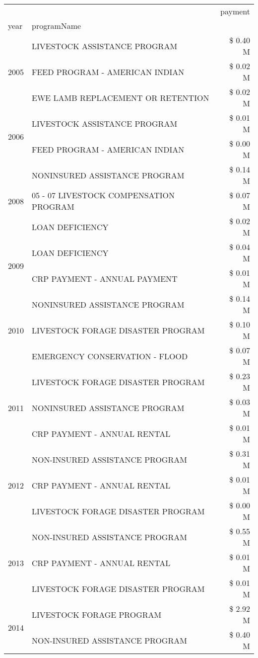 \begin{tabular}{llr}
\toprule
 &  & payment \\
year & programName &  \\
\midrule
\multirow[t]{3}{*}{2005} & LIVESTOCK ASSISTANCE PROGRAM & \$ 0.40 M \\
 & FEED PROGRAM - AMERICAN INDIAN & \$ 0.02 M \\
 & EWE LAMB REPLACEMENT OR RETENTION & \$ 0.02 M \\
\cline{1-3}
\multirow[t]{2}{*}{2006} & LIVESTOCK ASSISTANCE PROGRAM & \$ 0.01 M \\
 & FEED PROGRAM - AMERICAN INDIAN & \$ 0.00 M \\
\cline{1-3}
\multirow[t]{3}{*}{2008} & NONINSURED ASSISTANCE PROGRAM & \$ 0.14 M \\
 & 05 - 07 LIVESTOCK COMPENSATION PROGRAM & \$ 0.07 M \\
 & LOAN DEFICIENCY & \$ 0.02 M \\
\cline{1-3}
\multirow[t]{2}{*}{2009} & LOAN DEFICIENCY & \$ 0.04 M \\
 & CRP PAYMENT - ANNUAL PAYMENT & \$ 0.01 M \\
\cline{1-3}
\multirow[t]{3}{*}{2010} & NONINSURED ASSISTANCE PROGRAM & \$ 0.14 M \\
 & LIVESTOCK FORAGE DISASTER PROGRAM & \$ 0.10 M \\
 & EMERGENCY CONSERVATION - FLOOD & \$ 0.07 M \\
\cline{1-3}
\multirow[t]{3}{*}{2011} & LIVESTOCK FORAGE DISASTER PROGRAM & \$ 0.23 M \\
 & NONINSURED ASSISTANCE PROGRAM & \$ 0.03 M \\
 & CRP PAYMENT - ANNUAL RENTAL & \$ 0.01 M \\
\cline{1-3}
\multirow[t]{3}{*}{2012} & NON-INSURED ASSISTANCE PROGRAM & \$ 0.31 M \\
 & CRP PAYMENT - ANNUAL RENTAL & \$ 0.01 M \\
 & LIVESTOCK FORAGE DISASTER PROGRAM & \$ 0.00 M \\
\cline{1-3}
\multirow[t]{3}{*}{2013} & NON-INSURED ASSISTANCE PROGRAM & \$ 0.55 M \\
 & CRP PAYMENT - ANNUAL RENTAL & \$ 0.01 M \\
 & LIVESTOCK FORAGE DISASTER PROGRAM & \$ 0.01 M \\
\cline{1-3}
\multirow[t]{3}{*}{2014} & LIVESTOCK FORAGE PROGRAM & \$ 2.92 M \\
 & NON-INSURED ASSISTANCE PROGRAM & \$ 0.40 M \\

\end{tabular}
